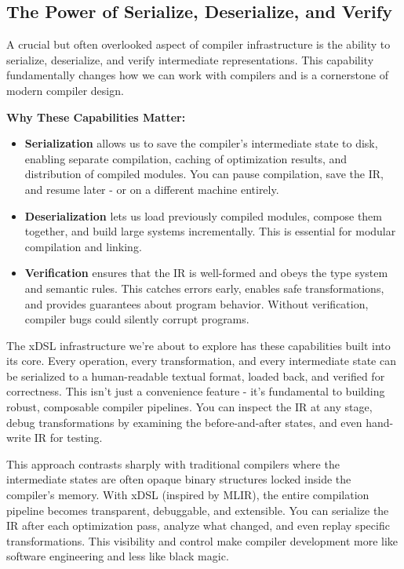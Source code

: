 \documentclass[11pt,a4paper]{article}
\begin{document}
\subsection{The Power of Serialize, Deserialize, and Verify}

A crucial but often overlooked aspect of compiler infrastructure is the ability to serialize, deserialize, and verify intermediate representations. This capability fundamentally changes how we can work with compilers and is a cornerstone of modern compiler design.

\textbf{Why These Capabilities Matter:}
\begin{itemize}
    \item \textbf{Serialization} allows us to save the compiler's intermediate state to disk, enabling separate compilation, caching of optimization results, and distribution of compiled modules. You can pause compilation, save the IR, and resume later - or on a different machine entirely.
    \item \textbf{Deserialization} lets us load previously compiled modules, compose them together, and build large systems incrementally. This is essential for modular compilation and linking.
    \item \textbf{Verification} ensures that the IR is well-formed and obeys the type system and semantic rules. This catches errors early, enables safe transformations, and provides guarantees about program behavior. Without verification, compiler bugs could silently corrupt programs.
\end{itemize}

The xDSL infrastructure we're about to explore has these capabilities built into its core. Every operation, every transformation, and every intermediate state can be serialized to a human-readable textual format, loaded back, and verified for correctness. This isn't just a convenience feature - it's fundamental to building robust, composable compiler pipelines. You can inspect the IR at any stage, debug transformations by examining the before-and-after states, and even hand-write IR for testing.

This approach contrasts sharply with traditional compilers where the intermediate states are often opaque binary structures locked inside the compiler's memory. With xDSL (inspired by MLIR), the entire compilation pipeline becomes transparent, debuggable, and extensible. You can serialize the IR after each optimization pass, analyze what changed, and even replay specific transformations. This visibility and control make compiler development more like software engineering and less like black magic.
\end{document}
